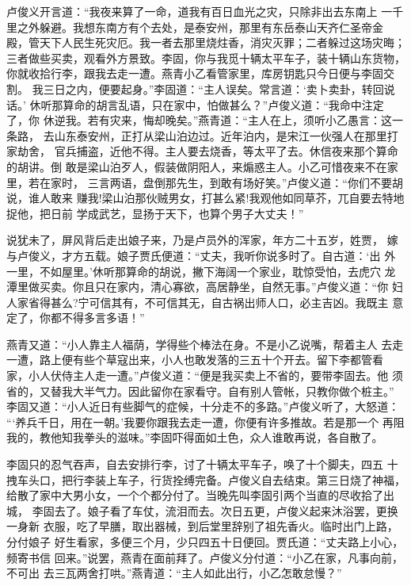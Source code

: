 卢俊义开言道：“我夜来算了一命，道我有百日血光之灾，只除非出去东南上
一千里之外躲避。我想东南方有个去处，是泰安州，那里有东岳泰山天齐仁圣帝金
殿，管天下人民生死灾厄。我一者去那里烧炷香，消灾灭罪；二者躲过这场灾晦；
三者做些买卖，观看外方景致。李固，你与我觅十辆太平车子，装十辆山东货物，
你就收拾行李，跟我去走一遭。燕青小乙看管家里，库房钥匙只今日便与李固交割。
我三日之内，便要起身。”李固道：“主人误矣。常言道：‘卖卜卖卦，转回说话。’
休听那算命的胡言乱语，只在家中，怕做甚么？”卢俊义道：“我命中注定了，你
休逆我。若有灾来，悔却晚矣。”燕青道：“主人在上，须听小乙愚言：这一条路，
去山东泰安州，正打从梁山泊边过。近年泊内，是宋江一伙强人在那里打家劫舍，
官兵捕盗，近他不得。主人要去烧香，等太平了去。休信夜来那个算命的胡讲。倒
敢是梁山泊歹人，假装做阴阳人，来煽惑主人。小乙可惜夜来不在家里，若在家时，
三言两语，盘倒那先生，到敢有场好笑。”卢俊义道：“你们不要胡说，谁人敢来
赚我!梁山泊那伙贼男女，打甚么紧!我观他如同草芥，兀自要去特地捉他，把日前
学成武艺，显扬于天下，也算个男子大丈夫！”

说犹未了，屏风背后走出娘子来，乃是卢员外的浑家，年方二十五岁，姓贾，
嫁与卢俊义，才方五载。娘子贾氏便道：“丈夫，我听你说多时了。自古道：‘出
外一里，不如屋里。’休听那算命的胡说，撇下海阔一个家业，耽惊受怕，去虎穴
龙潭里做买卖。你且只在家内，清心寡欲，高居静坐，自然无事。”卢俊义道：“你
妇人家省得甚么?宁可信其有，不可信其无，自古祸出师人口，必主吉凶。我既主
意定了，你都不得多言多语！”

燕青又道：“小人靠主人福荫，学得些个棒法在身。不是小乙说嘴，帮着主人
去走一遭，路上便有些个草寇出来，小人也敢发落的三五十个开去。留下李都管看
家，小人伏侍主人走一遭。”卢俊义道：“便是我买卖上不省的，要带李固去。他
须省的，又替我大半气力。因此留你在家看守。自有别人管帐，只教你做个桩主。”
李固又道：“小人近日有些脚气的症候，十分走不的多路。”卢俊义听了，大怒道：
“‘养兵千日，用在一朝。’我要你跟我去走一遭，你便有许多推故。若是那一个
再阻我的，教他知我拳头的滋味。”李固吓得面如土色，众人谁敢再说，各自散了。

李固只的忍气吞声，自去安排行李，讨了十辆太平车子，唤了十个脚夫，四五
十拽车头口，把行李装上车子，行货拴缚完备。卢俊义自去结束。第三日烧了神福，
给散了家中大男小女，一个个都分付了。当晚先叫李固引两个当直的尽收拾了出城，
李固去了。娘子看了车仗，流泪而去。次日五更，卢俊义起来沐浴罢，更换一身新
衣服，吃了早膳，取出器械，到后堂里辞别了祖先香火。临时出门上路，分付娘子
好生看家，多便三个月，少只四五十日便回。贾氏道：“丈夫路上小心，频寄书信
回来。”说罢，燕青在面前拜了。卢俊义分付道：“小乙在家，凡事向前，不可出
去三瓦两舍打哄。”燕青道：“主人如此出行，小乙怎敢怠慢？”

